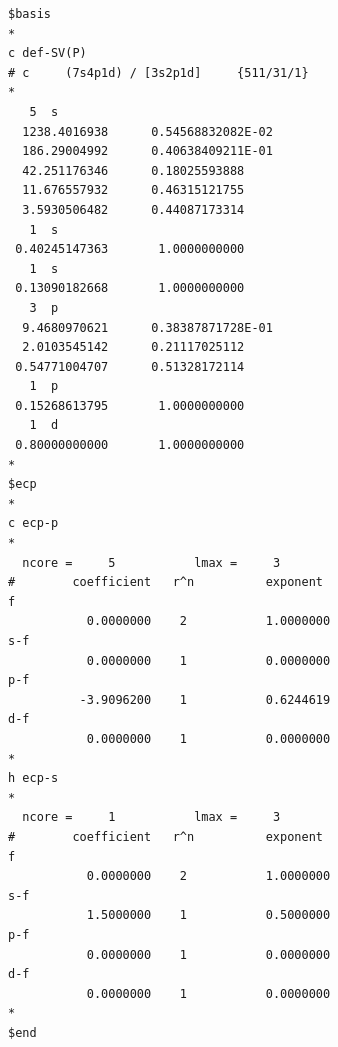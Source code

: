 \documentclass[aip]{revtex4-1}
\begin{document}
\begin{verbatim}
$basis
*
c def-SV(P)
# c     (7s4p1d) / [3s2p1d]     {511/31/1}
*
   5  s
  1238.4016938      0.54568832082E-02
  186.29004992      0.40638409211E-01
  42.251176346      0.18025593888
  11.676557932      0.46315121755
  3.5930506482      0.44087173314
   1  s
 0.40245147363       1.0000000000
   1  s
 0.13090182668       1.0000000000
   3  p
  9.4680970621      0.38387871728E-01
  2.0103545142      0.21117025112
 0.54771004707      0.51328172114
   1  p
 0.15268613795       1.0000000000
   1  d
 0.80000000000       1.0000000000
*
$ecp
*
c ecp-p
*
  ncore =     5           lmax =     3
#        coefficient   r^n          exponent
f
           0.0000000    2           1.0000000
s-f
           0.0000000    1           0.0000000
p-f
          -3.9096200    1           0.6244619
d-f
           0.0000000    1           0.0000000
*
h ecp-s
*
  ncore =     1           lmax =     3
#        coefficient   r^n          exponent
f
           0.0000000    2           1.0000000
s-f
           1.5000000    1           0.5000000
p-f
           0.0000000    1           0.0000000
d-f
           0.0000000    1           0.0000000
*
$end

\end{verbatim}

\clearpage


\end{document}
